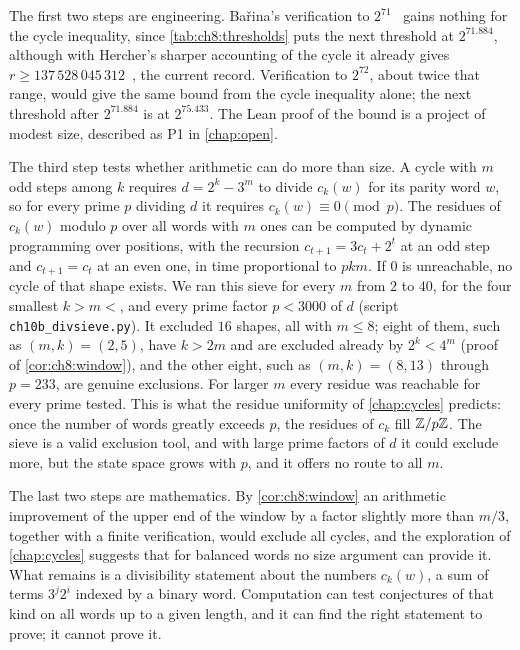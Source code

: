 The first two steps are engineering. Ba\v{r}ina's verification to $2^{71}$~\cite{barina2025}
gains nothing for the cycle inequality, since \cref{tab:ch8:thresholds} puts the
next threshold at $2^{71.884}$, although with Hercher's sharper accounting of the
cycle it already gives $r\ge137\,528\,045\,312$~\cite[Corollary~29]{hercher2023},
the current record. Verification to $2^{72}$, about twice that range, would
give the same bound from the cycle inequality alone; the next
threshold after $2^{71.884}$ is at $2^{75.433}$. The Lean proof of the bound is a project of
modest size, described as P1 in \cref{chap:open}.

The third step tests whether arithmetic can do more than size. A cycle with $m$
odd steps among $k$ requires $d=2^k-3^m$ to divide $c_k(w)$ for its parity word
$w$, so for every prime $p$ dividing $d$ it requires $c_k(w)\equiv0\pmod p$. The
residues of $c_k(w)$ modulo $p$ over all words with $m$ ones can be computed by
dynamic programming over positions, with the recursion $c_{t+1}=3c_t+2^t$ at an
odd step and $c_{t+1}=c_t$ at an even one, in time proportional to $pkm$. If $0$
is unreachable, no cycle of that shape exists. We ran this sieve for every $m$ from $2$ to $40$, for the four smallest $k>m\lt$, and every prime factor $p<3000$ of $d$ (script \texttt{ch10b\_divsieve.py}). It excluded $16$ shapes, all with $m\le8$; eight of them, such as $(m,k)=(2,5)$, have $k>2m$ and are excluded already by $2^k<4^m$ (proof of \cref{cor:ch8:window}), and the other eight, such as $(m,k)=(8,13)$ through $p=233$, are genuine exclusions. For larger $m$ every residue was
reachable for every prime tested. This is what the residue uniformity of
\cref{chap:cycles} predicts: once the number of words greatly exceeds $p$, the
residues of $c_k$ fill $\mathbb{Z}/p\mathbb{Z}$. The sieve is a valid exclusion tool, and with
large prime factors of $d$ it could exclude more, but the state space grows with
$p$, and it offers no route to all $m$.

The last two steps are mathematics. By \cref{cor:ch8:window} an arithmetic improvement of the upper end of the window by a factor slightly more than $m/3$, together with a finite verification, would exclude all cycles, and the exploration of \cref{chap:cycles} suggests that for
balanced words no size argument can provide it. What remains is a divisibility
statement about the numbers $c_k(w)$, a sum of terms $3^j2^i$ indexed by a
binary word. Computation can test conjectures of that kind on all words up to a
given length, and it can find the right statement to prove; it cannot prove it.


